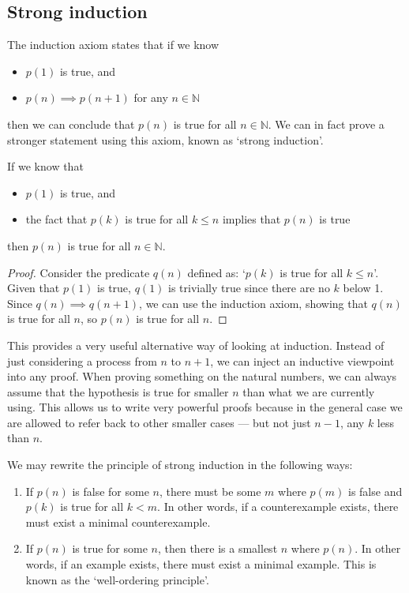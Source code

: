 \subsection{Strong induction}
The induction axiom states that if we know
\begin{itemize}
	\item \(p(1)\) is true, and
	\item \(p(n) \implies p(n+1)\) for any \(n \in \mathbb N\)
\end{itemize}
then we can conclude that \(p(n)\) is true for all \(n \in \mathbb N\).
We can in fact prove a stronger statement using this axiom, known as `strong induction'.
\begin{claim}
	If we know that
	\begin{itemize}
		\item \(p(1)\) is true, and
		\item the fact that \(p(k)\) is true for all \(k\leq n\) implies that \(p(n)\) is true
	\end{itemize}
	then \(p(n)\) is true for all \(n \in \mathbb N\).
\end{claim}
\begin{proof}
	Consider the predicate \(q(n)\) defined as: `\(p(k)\) is true for all \(k \leq n\)'.
	Given that \(p(1)\) is true, \(q(1)\) is trivially true since there are no \(k\) below 1.
	Since \(q(n) \implies q(n+1)\), we can use the induction axiom, showing that \(q(n)\) is true for all \(n\), so \(p(n)\) is true for all \(n\).
\end{proof}
This provides a very useful alternative way of looking at induction.
Instead of just considering a process from \(n\) to \(n+1\), we can inject an inductive viewpoint into any proof.
When proving something on the natural numbers, we can always assume that the hypothesis is true for smaller \(n\) than what we are currently using.
This allows us to write very powerful proofs because in the general case we are allowed to refer back to other smaller cases --- but not just \(n-1\), any \(k\) less than \(n\).

We may rewrite the principle of strong induction in the following ways:
\begin{enumerate}
	\item If \(p(n)\) is false for some \(n\), there must be some \(m\) where \(p(m)\) is false and \(p(k)\) is true for all \(k<m\).
	      In other words, if a counterexample exists, there must exist a minimal counterexample.
	\item If \(p(n)\) is true for some \(n\), then there is a smallest \(n\) where \(p(n)\).
	      In other words, if an example exists, there must exist a minimal example.
	      This is known as the `well-ordering principle'.
\end{enumerate}

